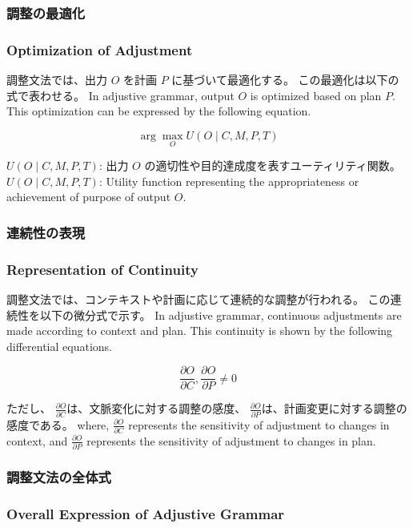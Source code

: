 \documentclass[a4paper]{article}
\begin{document}
\subsubsection{調整の最適化}
\else
\subsubsection{Optimization of Adjustment}
\fi

\ifJPN
調整文法では、出力 \( O \) を計画 \( P \) に基づいて最適化する。
この最適化は以下の式で表わせる。
\else
In adjustive grammar, output \( O \) is optimized based on plan \( P \).
This optimization can be expressed by the following equation.
\fi

\[
\arg\max_{O} U(O \mid C, M, P, T)
\]

\ifJPN
\( U(O \mid C, M, P, T) \): 出力 \( O \) の適切性や目的達成度を表すユーティリティ関数。
\else
\( U(O \mid C, M, P, T) \): Utility function representing the appropriateness or achievement of purpose of output \( O \).
\fi

\ifJPN
\subsubsection{連続性の表現}
\else
\subsubsection{Representation of Continuity}
\fi

\ifJPN
調整文法では、コンテキストや計画に応じて連続的な調整が行われる。
この連続性を以下の微分式で示す。
\else
In adjustive grammar, continuous adjustments are made according to context and plan.
This continuity is shown by the following differential equations.
\fi

\[
\frac{\partial O}{\partial C}, \frac{\partial O}{\partial P} \neq 0
\]

\ifJPN
ただし、
\( \frac{\partial O}{\partial C} \)は、文脈変化に対する調整の感度、
\( \frac{\partial O}{\partial P} \)は、計画変更に対する調整の感度である。
\else
where, \( \frac{\partial O}{\partial C} \) represents the sensitivity of adjustment to changes in context, and \( \frac{\partial O}{\partial P} \) represents the sensitivity of adjustment to changes in plan.
\fi

\ifJPN
\subsubsection{調整文法の全体式}
\else
\subsubsection{Overall Expression of Adjustive Grammar}
\fi
\end{document}
